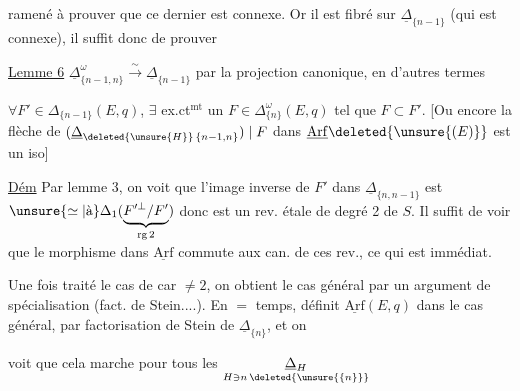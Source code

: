 
ramené à prouver que ce dernier est connexe. Or il est fibré sur $\underline\Delta_{\{n-1\}}$ (qui est connexe), il suffit donc de prouver

\uline{Lemme 6} $\underline\Delta_{\{n-1,n\}}^\omega\xrightarrow{\sim}\underline\Delta_{\{n-1\}}$ par la projection canonique, en d'autres termes


$\forall F'\in\Delta_{\{n-1\}}(E,q)$, $\exists$ ex.ct$^{\mathrm{mt}}$ un $F\in\Delta_{\{n\}}^\omega(E,q)$ tel que $F\subset F'$. [Ou encore la flèche de $(\underline\Delta_{\deleted{\unsure{H}}\,\{n-1,n\}})\mid F$ dans $\underline{\mathrm{Arf}}\deleted{\unsure{(E)}}$ est un iso]

\uline{Dém} Par lemme 3, on voit que l'image inverse de $F'$ dans $\underline\Delta_{\{n,n-1\}}$ est $\unsure{\simeq|\text{à}}\Delta_1(\underbrace{F'^\perp/F'}_{\mathrm{rg}\,2})$ donc est un rev. étale de degré 2 de $S$. Il suffit de voir que le morphisme  dans $\underline{\mathrm{Arf}}$ commute aux  can. de ces rev., ce qui est immédiat.

Une fois traité le cas de car $\neq2$,  on obtient le cas général par un argument de spécialisation (fact. de Stein....). En $=$ temps,  définit $\underline{\mathrm{Arf}}(E,q)$ dans le cas général, par factorisation de Stein de $\underline\Delta_{\{n\}}$, et on

voit que cela marche pour tous les $\underset{\substack{H\ni n\,\deleted{\unsure{\{n\}}}}}{\underline\Delta_H}$ 

